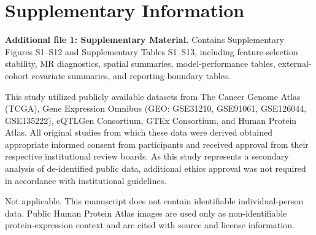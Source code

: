 \documentclass[pdflatex,sn-mathphys-num,referee,lineno]{sn-jnl}
\theoremstyle{thmstyleone}%
\theoremstyle{thmstyletwo}%
\theoremstyle{thmstylethree}%
\begin{document}
\section*{Supplementary Information}
\textbf{Additional file 1: Supplementary Material.} Contains Supplementary Figures S1--S12 and Supplementary Tables S1--S13, including feature-selection stability, MR diagnostics, spatial summaries, model-performance tables, external-cohort covariate summaries, and reporting-boundary tables.

\backmatter


This study utilized publicly available datasets from The Cancer Genome Atlas (TCGA), Gene Expression Omnibus (GEO: GSE31210, GSE91061, GSE126044, GSE135222), eQTLGen Consortium, GTEx Consortium, and Human Protein Atlas. All original studies from which these data were derived obtained appropriate informed consent from participants and received approval from their respective institutional review boards. As this study represents a secondary analysis of de-identified public data, additional ethics approval was not required in accordance with institutional guidelines.

Not applicable. This manuscript does not contain identifiable individual-person data. Public Human Protein Atlas images are used only as non-identifiable protein-expression context and are cited with source and license information.
\end{document}
